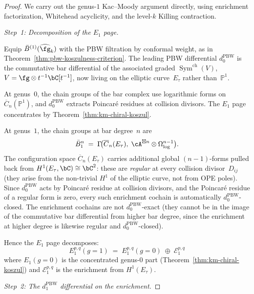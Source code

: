 \begin{proof}
We carry out the genus-$1$ Kac--Moody argument directly, using
enrichment factorization, Whitehead acyclicity, and the
level-$k$ Killing contraction.

\medskip
\emph{Step~1: Decomposition of the $E_1$ page.}

Equip $\bar{B}^{(1)}(\widehat{\fg}_k)$ with the PBW filtration
by conformal weight, as in
Theorem~\ref{thm:pbw-koszulness-criterion}.
The leading PBW differential $d_0^{\mathrm{PBW}}$ is the
commutative bar differential of the associated graded
$\operatorname{Sym}^{\mathrm{ch}}(V)$, $V = \fg \otimes
t^{-1}\bC[t^{-1}]$, now living on the
elliptic curve~$E_\tau$ rather than~$\mathbb{P}^1$.

At genus~$0$, the chain groups of the bar complex use
logarithmic forms on $\overline{C}_n(\mathbb{P}^1)$, and
$d_0^{\mathrm{PBW}}$ extracts Poincar\'{e} residues at
collision divisors.  The $E_1$ page concentrates
by Theorem~\ref{thm:km-chiral-koszul}.

At genus~$1$, the chain groups at bar degree~$n$ are
\[
\bar{B}^n_1 \;=\;
\Gamma\!\bigl(\overline{C}_n(E_\tau),\;
\cA^{\boxtimes n} \otimes \Omega^{n-1}_{\log}\bigr).
\]
The configuration space $\overline{C}_n(E_\tau)$ carries
additional global $(n{-}1)$-forms pulled back from
$H^1(E_\tau, \bC) \cong \bC^2$: these are
\emph{regular} at every collision divisor~$D_{ij}$
(they arise from the non-trivial $H^1$ of the elliptic curve,
not from OPE poles).  Since $d_0^{\mathrm{PBW}}$ acts by
Poincar\'{e} residue at collision divisors, and the
Poincar\'{e} residue of a regular form is zero, every
such enrichment cochain is automatically $d_0^{\mathrm{PBW}}$-closed.
The enrichment cochains are not
$d_0^{\mathrm{PBW}}$-exact (they cannot be in the image
of the commutative bar differential from higher bar degree,
since the enrichment at higher degree is likewise
regular and $d_0^{\mathrm{PBW}}$-closed).

Hence the $E_1$ page decomposes:
\begin{equation}\label{eq:e1-decomposition-genus1}
E_1^{p,q}(g{=}1) \;=\; E_1^{p,q}(g{=}0)
  \;\oplus\; \mathcal{E}^{p,q}_1
\end{equation}
where $E_1(g{=}0)$ is the concentrated genus-$0$
part (Theorem~\ref{thm:km-chiral-koszul}) and
$\mathcal{E}^{p,q}_1$ is the enrichment from
$H^1(E_\tau)$.

\medskip
\emph{Step~2: The $d_1^{\mathrm{PBW}}$ differential on
the enrichment.}


\end{proof}

